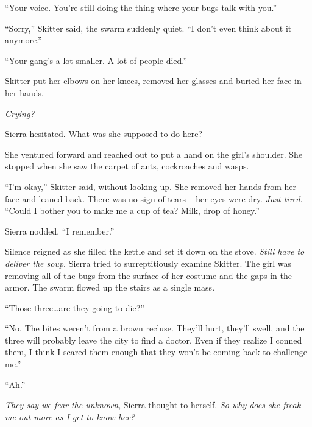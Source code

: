 ``Your voice.  You're still doing the thing where your bugs talk with you.''



``Sorry,'' Skitter said, the swarm suddenly quiet.  ``I don't even think about it anymore.''



``Your gang's a lot smaller.  A lot of people died.''



Skitter put her elbows on her knees, removed her glasses and buried her face in her hands.



\emph{Crying?}



Sierra hesitated.  What was she supposed to do here?



She ventured forward and reached out to put a hand on the girl's shoulder.  She stopped when she saw the carpet of ants, cockroaches and wasps.



``I'm okay,'' Skitter said, without looking up.  She removed her hands from her face and leaned back.  There was no sign of tears – her eyes were dry.  \emph{Just tired}.  ``Could I bother you to make me a cup of tea?  Milk, drop of honey.''



Sierra nodded, ``I remember.''



Silence reigned as she filled the kettle and set it down on the stove.  \emph{Still have to deliver the soup}.  Sierra tried to surreptitiously examine Skitter.  The girl was removing all of the bugs from the surface of her costume and the gaps in the armor.  The swarm flowed up the stairs as a single mass.



``Those three\ldots are they going to die?''



``No.  The bites weren't from a brown recluse.  They'll hurt, they'll swell, and the three will probably leave the city to find a doctor.  Even if they realize I conned them, I think I scared them enough that they won't be coming back to challenge me.''



``Ah.''



\emph{They say we fear the unknown}, Sierra thought to herself.  \emph{So why does she freak me out more as I get to know her?}



